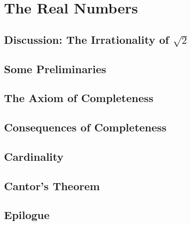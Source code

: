 \documentclass[class=understanding-analysis,crop=false]{standalone}
\begin{document}
\chapter{The Real Numbers}

\section{Discussion: The Irrationality of $\sqrt{2}$}

\section{Some Preliminaries}

\section{The Axiom of Completeness}

\section{Consequences of Completeness}

\section{Cardinality}

\section{Cantor's Theorem}

\section{Epilogue}
\end{document}

